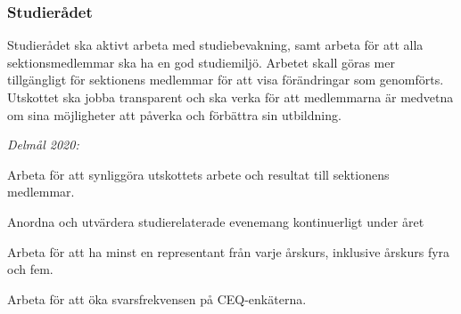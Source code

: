 \documentclass[10pt]{article}
\begin{document}
    \subsubsection*{Studierådet}
    Studierådet ska aktivt arbeta med studiebevakning, samt arbeta för att alla sektionsmedlemmar ska ha en god studiemiljö. Arbetet skall göras mer tillgängligt för sektionens medlemmar för att visa förändringar som genomförts. Utskottet ska jobba transparent och ska verka för att medlemmarna är medvetna  om sina möjligheter att påverka och förbättra sin utbildning.
    
    \emph{Delmål 2020:}
    \begin{dashlist}
        \item Arbeta för att synliggöra utskottets arbete och resultat till sektionens medlemmar.
        \item Anordna och utvärdera studierelaterade evenemang kontinuerligt under året
        \item Arbeta för att ha minst en representant från varje årskurs, inklusive årskurs fyra och fem.
        \item Arbeta för att öka svarsfrekvensen på CEQ-enkäterna.
    \end{dashlist}
    
    \newpage
    
\end{document}
